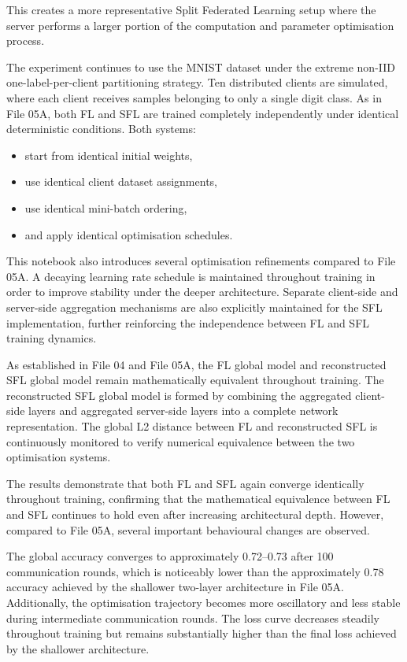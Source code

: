 This creates a more representative Split Federated Learning setup where the server performs a larger portion of the computation and parameter optimisation process.

The experiment continues to use the MNIST dataset under the extreme non-IID one-label-per-client partitioning strategy. Ten distributed clients are simulated, where each client receives samples belonging to only a single digit class. As in File 05A, both FL and SFL are trained completely independently under identical deterministic conditions. Both systems:
\begin{itemize}
    \item start from identical initial weights,
    \item use identical client dataset assignments,
    \item use identical mini-batch ordering,
    \item and apply identical optimisation schedules.
\end{itemize}

This notebook also introduces several optimisation refinements compared to File 05A. A decaying learning rate schedule is maintained throughout training in order to improve stability under the deeper architecture. Separate client-side and server-side aggregation mechanisms are also explicitly maintained for the SFL implementation, further reinforcing the independence between FL and SFL training dynamics.

As established in File 04 and File 05A, the FL global model and reconstructed SFL global model remain mathematically equivalent throughout training. The reconstructed SFL global model is formed by combining the aggregated client-side layers and aggregated server-side layers into a complete network representation. The global L2 distance between FL and reconstructed SFL is continuously monitored to verify numerical equivalence between the two optimisation systems.

The results demonstrate that both FL and SFL again converge identically throughout training, confirming that the mathematical equivalence between FL and SFL continues to hold even after increasing architectural depth. However, compared to File 05A, several important behavioural changes are observed.

The global accuracy converges to approximately 0.72--0.73 after 100 communication rounds, which is noticeably lower than the approximately 0.78 accuracy achieved by the shallower two-layer architecture in File 05A. Additionally, the optimisation trajectory becomes more oscillatory and less stable during intermediate communication rounds. The loss curve decreases steadily throughout training but remains substantially higher than the final loss achieved by the shallower architecture.

